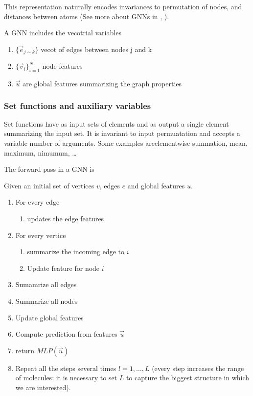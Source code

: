 This representation naturally encodes invariances to permutation of nodes, and
distances between atoms (See more about \glspl{GNN} in \cite{scarselli2009graph},
\cite{li2018learning}).

A \gls{GNN} includes the vecotrial variables

\begin{enumerate}
  \item $\{\vec{e}_{j\sim k}\}$ vecot of edges between nodes j and k
  \item $\{\vec{v}_i\}_{i=1}^N$ node features
  \item $\vec{u}$ are global features summarizing the graph properties
\end{enumerate}

\subsubsection{Set functions and auxiliary variables}

Set functions have as input sets of elements and as output a single element
summarizing the input set. It is invariant to input permuatation and accepts a
variable number of arguments. Some examples areelementwise summation, mean,
maximum, nimumum, \dots

The forward pass in a \gls{GNN} is

Given an initial set of vertices $v$, edges $e$ and global features $u$.

\begin{enumerate}
  \item For every edge
    \begin{enumerate}
      \item  updates the edge features
    \end{enumerate}
  \item For every vertice
    \begin{enumerate}
      \item summarize the incoming edge to $i$
      \item Update feature for node $i$
    \end{enumerate}
  \item Sumamrize all edges
  \item Summarize all nodes
  \item Update global features
  \item Compute prediction from features $\vec{u}$
  \item return $MLP(\vec{u})$
  \item Repeat all the steps several times $l=1,\dots,L$ (every step increases
    the range of molecules; it is necessary to set $L$ to capture the biggest
  structure in which we are interested).
\end{enumerate}

